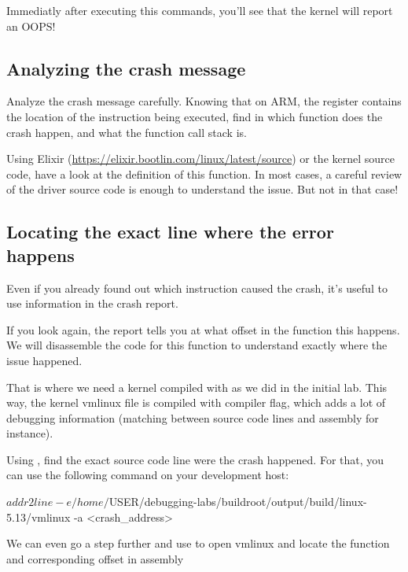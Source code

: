 
Immediatly after executing this commands, you'll see that the kernel will report
an OOPS!

\subsection{Analyzing the crash message}

Analyze the crash message carefully. Knowing that on ARM, the 
register contains the location of the instruction being executed, find
in which function does the crash happen, and what the function call
stack is.

Using Elixir (\url{https://elixir.bootlin.com/linux/latest/source}) or the
kernel source code, have a look at the definition of this function. In most
cases, a careful review of the driver source code is enough to understand the
issue. But not in that case!

\subsection{Locating the exact line where the error happens}

Even if you already found out which instruction caused the crash, it's
useful to use information in the crash report.

If you look again, the report tells you at what offset in the function
this happens. We will disassemble the code for this function to understand
exactly where the issue happened.

That is where we need a kernel compiled with 
as we did in the initial lab. This way, the kernel vmlinux file is
compiled with  compiler flag, which adds a lot of debugging
information (matching between source code lines and assembly for instance).

Using , find the exact source code line were the crash happened.
For that, you can use the following command on your development host:

\begin{bashinput}
$ addr2line -e /home/$USER/debugging-labs/buildroot/output/build/linux-5.13/vmlinux
  -a <crash_address>
\end{bashinput}

We can even go a step further and use  to open vmlinux and
locate the function and corresponding offset in assembly


